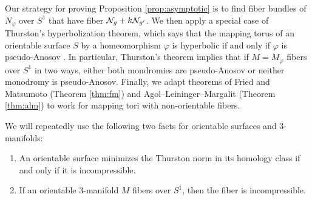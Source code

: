 Our strategy for proving Proposition \ref{prop:asymptotic} is to find fiber bundles of $N_{\varphi}$ over $S^1$ that have fiber $\mathcal{N}_g+k\mathcal{N}_{g'}$.  We then apply a special case of Thurston's hyperbolization theorem, which says that the mapping torus of an orientable surface $S$ by a homeomorphism $\varphi$ is hyperbolic if and only if $\varphi$ is pseudo-Anosov \cite[Theorem 0.1]{thurston_hyp}.  In particular, Thurston's theorem implies that if $M=M_\varphi$ fibers over $S^1$ in two ways, either both mondromies are pseudo-Anosov or neither monodromy is pseudo-Anosov.  Finally, we adapt theorems of Fried and Matsumoto (Theorem \ref{thm:fm}) and Agol--Leininger--Margalit (Theorem \ref{thm:alm}) to work for mapping tori with non-orientable fibers.


\medskip
We will repeatedly use the following two facts for orientable surfaces and 3-manifolds:
\begin{enumerate}
 \item An orientable surface minimizes the Thurston norm in its homology class if and only if it is incompressible.
\item  If an orientable 3-manifold $M$ fibers over $S^1$, then the fiber is incompressible.
\end{enumerate}





